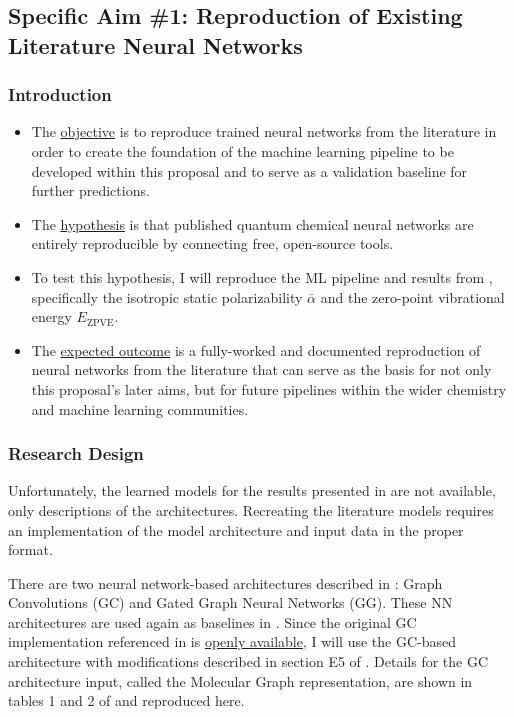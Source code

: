 \documentclass[12pt]{article}
\begin{document}
\subsection{Specific Aim \#1: Reproduction of Existing Literature Neural Networks}
\label{sec:org2979ab2}

\subsubsection{Introduction}
\label{sec:org3dce0ac}

\begin{itemize}
\item The \uline{objective} is to reproduce trained neural networks from the literature in order to create the foundation of the machine learning pipeline to be developed within this proposal and to serve as a validation baseline for further predictions.

\item The \uline{hypothesis} is that published quantum chemical neural networks are entirely reproducible by connecting free, open-source tools.

\item To test this hypothesis, I will reproduce the ML pipeline and results from \parencite{2017arXiv170205532F}, specifically the isotropic static polarizability \(\bar{\alpha}\) and the zero-point vibrational energy \(E_{\text{ZPVE}}\).

\item The \uline{expected outcome} is a fully-worked and documented reproduction of neural networks from the literature that can serve as the basis for not only this proposal's later aims, but for future pipelines within the wider chemistry and machine learning communities.
\end{itemize}

\subsubsection{Research Design}
\label{sec:org68663a9}

Unfortunately, the learned models for the results presented in \parencite{2017arXiv170205532F} are not available, only descriptions of the architectures. Recreating the literature models requires an implementation of the model architecture and input data in the proper format.

There are two neural network-based architectures described in \parencite{2017arXiv170205532F}: Graph Convolutions \cite{Kearnes2016} (GC) and Gated Graph Neural Networks \cite{2015arXiv151105493L} (GG). These NN architectures are used again as baselines in \parencite{2017arXiv170401212G}. Since the original GC implementation referenced in \parencite{2017arXiv170205532F} is \href{https://github.com/tkipf/gcn}{openly available}\cite{kipf2016semi}, I will use the GC-based architecture with modifications described in section E5 of \parencite{2017arXiv170205532F}.  Details for the GC architecture input, called the Molecular Graph representation, are shown in tables 1 and 2 of \parencite{2017arXiv170205532F} and reproduced here.
\end{document}
